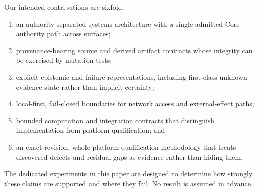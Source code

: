 Our intended contributions are sixfold:
\begin{enumerate}
  \item an authority-separated systems architecture with a single admitted Core authority path across surfaces;
  \item provenance-bearing source and derived artifact contracts whose integrity can be exercised by mutation tests;
  \item explicit epistemic and failure representations, including first-class unknown evidence state rather than implicit certainty;
  \item local-first, fail-closed boundaries for network access and external-effect paths;
  \item bounded computation and integration contracts that distinguish implementation from platform qualification; and
  \item an exact-revision, whole-platform qualification methodology that treats discovered defects and residual gaps as evidence rather than hiding them.
\end{enumerate}

The dedicated experiments in this paper are designed to determine how strongly these claims are supported and where they fail. No result is assumed in advance.
